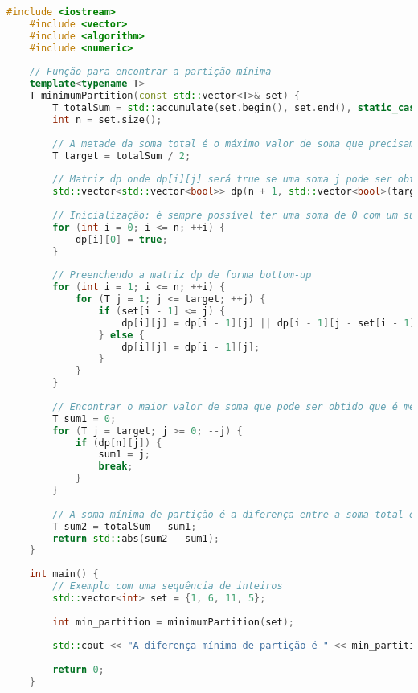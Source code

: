 \documentclass{article}
\begin{document}
\begin{lstlisting}[language=C++, caption=Minimum Partition]
    #include <iostream>
    #include <vector>
    #include <algorithm>
    #include <numeric>
    
    // Função para encontrar a partição mínima
    template<typename T>
    T minimumPartition(const std::vector<T>& set) {
        T totalSum = std::accumulate(set.begin(), set.end(), static_cast<T>(0));
        int n = set.size();
        
        // A metade da soma total é o máximo valor de soma que precisamos considerar
        T target = totalSum / 2;
        
        // Matriz dp onde dp[i][j] será true se uma soma j pode ser obtida usando os primeiros i itens
        std::vector<std::vector<bool>> dp(n + 1, std::vector<bool>(target + 1, false));
        
        // Inicialização: é sempre possível ter uma soma de 0 com um subconjunto vazio
        for (int i = 0; i <= n; ++i) {
            dp[i][0] = true;
        }
    
        // Preenchendo a matriz dp de forma bottom-up
        for (int i = 1; i <= n; ++i) {
            for (T j = 1; j <= target; ++j) {
                if (set[i - 1] <= j) {
                    dp[i][j] = dp[i - 1][j] || dp[i - 1][j - set[i - 1]];
                } else {
                    dp[i][j] = dp[i - 1][j];
                }
            }
        }
    
        // Encontrar o maior valor de soma que pode ser obtido que é menor ou igual a target
        T sum1 = 0;
        for (T j = target; j >= 0; --j) {
            if (dp[n][j]) {
                sum1 = j;
                break;
            }
        }
    
        // A soma mínima de partição é a diferença entre a soma total e duas vezes a maior soma possível que é <= target
        T sum2 = totalSum - sum1;
        return std::abs(sum2 - sum1);
    }
    
    int main() {
        // Exemplo com uma sequência de inteiros
        std::vector<int> set = {1, 6, 11, 5};
        
        int min_partition = minimumPartition(set);
    
        std::cout << "A diferença mínima de partição é " << min_partition << std::endl;
    
        return 0;
    }
\end{lstlisting}
\end{document}
